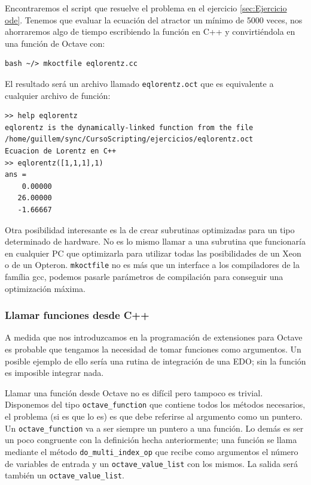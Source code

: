 Encontraremos el script que resuelve el problema en el ejercicio
\ref{sec:Ejercicio ode}.  Tenemos que evaluar la ecuación del atractor
un mínimo de 5000 veces, nos ahorraremos algo de tiempo escribiendo la
función en C++ y convirtiéndola en una función de Octave con:

\begin{verbatim}
bash ~/> mkoctfile eqlorentz.cc
\end{verbatim}

El resultado será un archivo llamado \texttt{eqlorentz.oct} que es
equivalente a cualquier archivo de función:

\begin{verbatim}
>> help eqlorentz
eqlorentz is the dynamically-linked function from the file
/home/guillem/sync/CursoScripting/ejercicios/eqlorentz.oct
Ecuacion de Lorentz en C++
>> eqlorentz([1,1,1],1)
ans =
    0.00000
   26.00000
   -1.66667
\end{verbatim}

Otra posibilidad interesante es la de crear subrutinas optimizadas
para un tipo determinado de hardware. No es lo mismo llamar a una
subrutina que funcionaría en cualquier PC que optimizarla para
utilizar todas las posibilidades de un Xeon o de un Opteron.
\texttt{mkoctfile} no es más que un interface a los compiladores de la
família gcc, podemos pasarle parámetros de compilación para conseguir
una optimización máxima.

\subsubsection{Llamar funciones desde C++}

A medida que nos introduzcamos en la programación de extensiones para
Octave es probable que tengamos la necesidad de tomar funciones como
argumentos.  Un posible ejemplo de ello sería una rutina de integración
de una EDO; sin la función es imposible integrar nada.

Llamar una función desde Octave no es difícil pero tampoco es trivial.
Disponemos del tipo \texttt{octave\_function} que contiene todos
los métodos necesarios, el problema (si es que lo es) es que debe
referirse al argumento como un puntero.  Un \texttt{octave\_function} va a ser
siempre un puntero a una función.  Lo demás es ser un poco congruente
con la definición hecha anteriormente; una función se llama
mediante el método \texttt{do\_multi\_index\_op} que recibe como argumentos
el número de variables de entrada y un \texttt{octave\_value\_list} con
los mismos.  La salida será también un \texttt{octave\_value\_list}.

